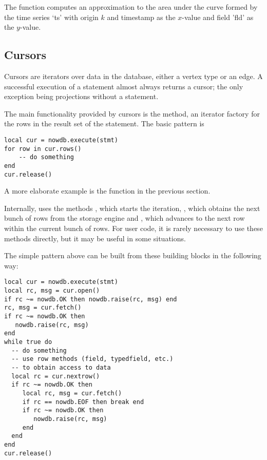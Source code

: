 The function computes an approximation
to the area under the curve
formed by the time series `ts' with origin $k$
and timestamp as the $x$-value and field 'fld'
as the $y$-value.

\subsection{Cursors}
Cursors are iterators over data in the database,
either a vertex type or an edge.
A successful execution of a 
statement almost always returns a cursor;
the only exception being projections without
a  statement.

The main functionality provided by cursors
is the  method, an iterator factory
for the rows in the
result set of the statement.
The basic pattern is

\begin{lua}
\begin{lstlisting}
local cur = nowdb.execute(stmt)
for row in cur.rows()
    -- do something
end
cur.release()
\end{lstlisting}
\end{lua}

A more elaborate example is the 
function in the previous section.

Internally,  uses the methods
, which starts the iteration,
, which obtains the next bunch
of rows from the storage engine and
, which advances to
the next row within the current bunch of rows.
For user code, it is rarely necessary to use
these methods directly, but it may be useful
in some situations.

The simple pattern above can be built from
these building blocks in the following way:

\begin{lua}
\begin{lstlisting}
local cur = nowdb.execute(stmt)
local rc, msg = cur.open()
if rc ~= nowdb.OK then nowdb.raise(rc, msg) end
rc, msg = cur.fetch()
if rc ~= nowdb.OK then
   nowdb.raise(rc, msg)
end
while true do
  -- do something
  -- use row methods (field, typedfield, etc.)
  -- to obtain access to data
  local rc = cur.nextrow()
  if rc ~= nowdb.OK then
     local rc, msg = cur.fetch()
     if rc == nowdb.EOF then break end
     if rc ~= nowdb.OK then
        nowdb.raise(rc, msg)
     end
  end
end
cur.release()
\end{lstlisting}
\end{lua}

